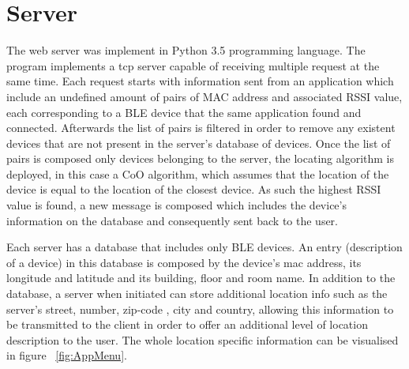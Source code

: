 \section{Server}
\label{sec:server}

The web server was implement in Python 3.5 programming language. The program implements a tcp server capable of receiving multiple request at the same time. Each request starts with information sent from an application which include an undefined amount of pairs of MAC address and associated RSSI value, each corresponding to a \ac{BLE} device that the same application found and connected. Afterwards the list of pairs is filtered in order to remove any existent devices that are not present in the server's database of devices. Once the list of pairs is composed only devices belonging to the server, the locating algorithm is deployed, in this case a \ac{CoO} algorithm, which assumes that the location of the device is equal to the location of the closest device. As such the highest \ac{RSSI} value is found, a new message is composed which includes the device's information on the database and consequently sent back to the user. 

Each server has a database that includes only \ac{BLE} devices. An entry (description of a device) in this database is composed by the device's mac address, its longitude and latitude and its building, floor and room name. In addition to the database, a server when initiated can store additional location info such as the server's street, number, zip-code , city and country, allowing this information to be transmitted to the client in order to offer an additional level of location description to the user. The whole location specific information can be visualised in figure ~\ref{fig:AppMenu}.
